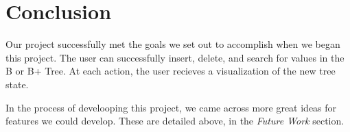 \section{Conclusion}

Our project successfully met the goals we set out to accomplish when
we began this project. The user can successfully insert, delete, and
search for values in the B or B+ Tree. At each action, the user
recieves a visualization of the new tree state.

In the process of develooping this project, we came across more great
ideas for features we could develop. These are detailed above, in the
\textit{Future Work} section.
